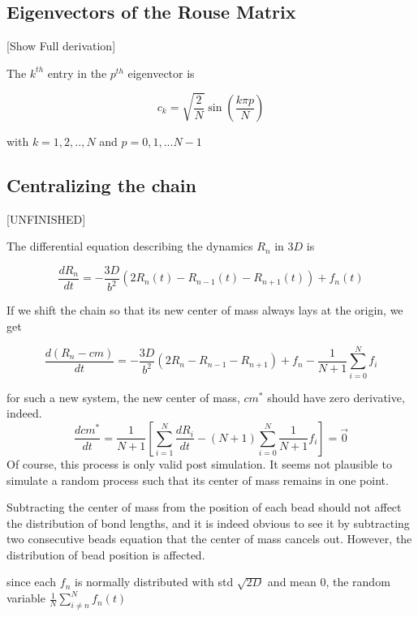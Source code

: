\documentclass{report}
\begin{document}
\subsection{Eigenvectors of the Rouse Matrix}\label{subsection_eigenvectorsOfTheRouseMatrix}
[Show Full derivation]

The $k^{th}$ entry in the $p^{th}$ eigenvector is 

\begin{equation*}
c_k = \sqrt{\frac{2}{N}}\sin(\frac{k\pi p}{N})
\end{equation*}

with $k=1,2,..,N$ and $p=0,1,...N-1$

\subsection{Centralizing the chain}\label{subsection_centralizingTheChain}
[UNFINISHED]

The differential equation describing the dynamics $R_n$ in $3D$ is

\begin{equation*}
\frac{dR_n}{dt} = -\frac{3D}{b^2}\left(2R_n(t)-R_{n-1}(t)-R_{n+1}(t) \right)+f_n(t)
\end{equation*}

If we shift the chain so that its new center of mass always lays at the origin, we get 

 \begin{equation*}
\frac{d(R_n-cm)}{dt} = -\frac{3D}{b^2}\left(2R_n-R_{n-1}-R_{n+1} \right)+f_n-\frac{1}{N+1}\sum_{i=0}^Nf_i
\end{equation*}

for such a new system, the new center of mass, $cm^*$ should have zero derivative, indeed. 
\begin{equation*}
\frac{dcm^*}{dt}=\frac{1}{N+1}\left[ \sum_{i=1}^N\frac{dR_i}{dt} - (N+1)\sum_{i=0}^N\frac{1}{N+1}f_i \right]= \vec{0}
\end{equation*}
Of course, this process is only valid post simulation. It seems not plausible to simulate a random process such that its center of mass remains in one point. 

Subtracting the center of mass from the position of each bead should not affect the distribution of bond lengths, and it is indeed obvious to see it by subtracting two consecutive beads equation that the center of mass cancels out. However, the distribution of bead position is affected. 

since each $f_n$ is normally distributed with std $\sqrt{2D}$ and mean 0, the random variable $\frac{1}{N}\sum_{i\neq n}^Nf_n(t)$ 
\end{document}

